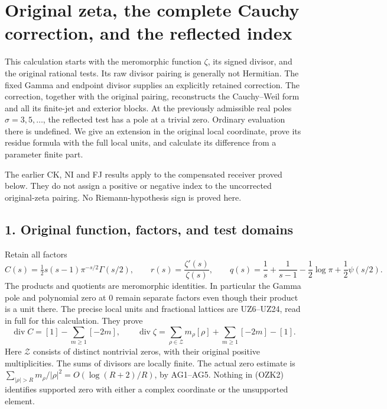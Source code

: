 \documentclass[
  10pt,
  a4paper,
]{article}
\author{}
\date{}
\begin{document}
{
\setcounter{tocdepth}{3}
\tableofcontents
}
\section{Original zeta, the complete Cauchy correction, and the
reflected
index}\label{original-zeta-the-complete-cauchy-correction-and-the-reflected-index}

This calculation starts with the meromorphic function \(\zeta\), its
signed divisor, and the original rational tests. Its raw divisor pairing
is generally not Hermitian. The fixed Gamma and endpoint divisor
supplies an explicitly retained correction. The correction, together
with the original pairing, reconstructs the Cauchy--Weil form and all
its finite-jet and exterior blocks. At the previously admissible real
poles \(\sigma=3,5,\ldots\), the reflected test has a pole at a trivial
zero. Ordinary evaluation there is undefined. We give an extension in
the original local coordinate, prove its residue formula with the full
local units, and calculate its difference from a parameter finite part.

The earlier CK, NI and FJ results apply to the compensated receiver
proved below. They do not assign a positive or negative index to the
uncorrected original-zeta pairing. No Riemann-hypothesis sign is proved
here.

\subsection{1. Original function, factors, and test
domains}\label{original-function-factors-and-test-domains}

Retain all factors \[
C(s)=\tfrac12s(s-1)\pi^{-s/2}\Gamma(s/2),\qquad
r(s)=\frac{\zeta'(s)}{\zeta(s)},\qquad
q(s)=\frac1s+\frac1{s-1}-\frac12\log\pi+\frac12\psi(s/2).
\tag{OZK1}
\] The products and quotients are meromorphic identities. In particular
the Gamma pole and polynomial zero at 0 remain separate factors even
though their product is a unit there. The precise local units and
fractional lattices are UZ6--UZ24, read in full for this calculation.
They prove \[
\operatorname{div}C=[1]-\sum_{m\ge1}[-2m],\qquad
\operatorname{div}\zeta=\sum_{\rho\in\mathcal Z}m_\rho[\rho]
 +\sum_{m\ge1}[-2m]-[1].
\tag{OZK2}
\] Here \(\mathcal Z\) consists of distinct nontrivial zeros, with their
original positive multiplicities. The sums of divisors are locally
finite. The actual zero estimate is
\(\sum_{|\rho|>R}m_\rho/|\rho|^2=O(\log(R+2)/R)\), by AG1--AG5. Nothing
in (OZK2) identifies supported zero with either a complex coordinate or
the unsupported element.
\end{document}
